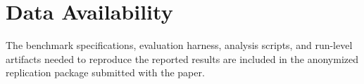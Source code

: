 \documentclass[acmsmall,screen,review,anonymous]{acmart}
\begin{document}
\section*{Data Availability}
The benchmark specifications, evaluation harness, analysis scripts, and
run-level artifacts needed to reproduce the reported results are included in the
anonymized replication package submitted with the paper.

\FloatBarrier


\end{document}
